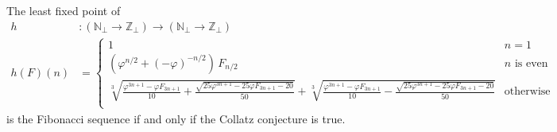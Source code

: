 \documentclass[12pt]{article}
\renewcommand{\phi}{\varphi}
\begin{document}
\noindent The least fixed point of 
\begin{align*}
    h & : (\mathbb{N}_\bot \to \mathbb{Z}_\bot) \to (\mathbb{N}_\bot \to \mathbb{Z}_\bot) \\
    h(F)(n) & = 
    \begin{cases}
        1 & n = 1 \\
        (\phi^{n/2} + (-\phi)^{-n/2})\, F_{n/2} & n \textrm{ is even} \\
        \sqrt[3]{\frac{\phi^{3n+1}-\phi F_{3n+1}}{10} + \frac{\sqrt{25 \phi^{3n+1} - 25\phi F_{3n+1} - 20}}{50}} + \sqrt[3]{\frac{\phi^{3n+1}-\phi F_{3n+1}}{10} - \frac{\sqrt{25 \phi^{3n+1} - 25\phi F_{3n+1} - 20}}{50}} & \textrm{otherwise} \\
    \end{cases}
\end{align*}
is the Fibonacci sequence if and only if the Collatz conjecture is true.
\end{document}
